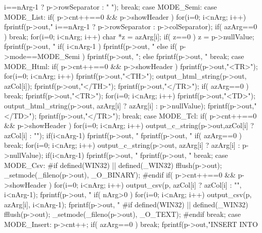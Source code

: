 \begin{Codex}[label=shell.c,numbers=left]
{{{{{{              i==nArg-1 ? p->rowSeparator : "  ");
        }
      }
      break;
    }
    case MODE_Semi:
    case MODE_List: {
      if( p->cnt++==0 && p->showHeader ){
        for(i=0; i<nArg; i++){
          fprintf(p->out,"%
                  i==nArg-1 ? p->rowSeparator : p->colSeparator);
        }
      }
      if( azArg==0 ) break;
      for(i=0; i<nArg; i++){
        char *z = azArg[i];
        if( z==0 ) z = p->nullValue;
        fprintf(p->out, "%
        if( i<nArg-1 ){
          fprintf(p->out, "%
        }else if( p->mode==MODE_Semi ){
          fprintf(p->out, ";%
        }else{
          fprintf(p->out, "%
        }
      }
      break;
    }
    case MODE_Html: {
      if( p->cnt++==0 && p->showHeader ){
        fprintf(p->out,"<TR>");
        for(i=0; i<nArg; i++){
          fprintf(p->out,"<TH>");
          output_html_string(p->out, azCol[i]);
          fprintf(p->out,"</TH>\n");
        }
        fprintf(p->out,"</TR>\n");
      }
      if( azArg==0 ) break;
      fprintf(p->out,"<TR>");
      for(i=0; i<nArg; i++){
        fprintf(p->out,"<TD>");
        output_html_string(p->out, azArg[i] ? azArg[i] : p->nullValue);
        fprintf(p->out,"</TD>\n");
      }
      fprintf(p->out,"</TR>\n");
      break;
    }
    case MODE_Tcl: {
      if( p->cnt++==0 && p->showHeader ){
        for(i=0; i<nArg; i++){
          output_c_string(p->out,azCol[i] ? azCol[i] : "");
          if(i<nArg-1) fprintf(p->out, "%
        }
        fprintf(p->out, "%
      }
      if( azArg==0 ) break;
      for(i=0; i<nArg; i++){
        output_c_string(p->out, azArg[i] ? azArg[i] : p->nullValue);
        if(i<nArg-1) fprintf(p->out, "%
      }
      fprintf(p->out, "%
      break;
    }
    case MODE_Csv: {
#if defined(WIN32) || defined(_WIN32)
      fflush(p->out);
      _setmode(_fileno(p->out), _O_BINARY);
#endif
      if( p->cnt++==0 && p->showHeader ){
        for(i=0; i<nArg; i++){
          output_csv(p, azCol[i] ? azCol[i] : "", i<nArg-1);
        }
        fprintf(p->out, "%
      }
      if( nArg>0 ){
        for(i=0; i<nArg; i++){
          output_csv(p, azArg[i], i<nArg-1);
        }
        fprintf(p->out, "%
      }
#if defined(WIN32) || defined(_WIN32)
      fflush(p->out);
      _setmode(_fileno(p->out), _O_TEXT);
#endif
      break;
    }
    case MODE_Insert: {
      p->cnt++;
      if( azArg==0 ) break;
      fprintf(p->out,"INSERT INTO %
}}}}
\end{Codex}
